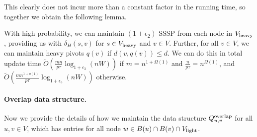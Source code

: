 This clearly does not incur more than a constant factor in the running time, so together we obtain the following lemma. 

\begin{lemma} \label{lm:heavy_MSSP}
    With high probability, we can maintain $(1+\epsilon_2)$-SSSP from each node in $ V_{\rm{heavy}} $, providing us with $\delta_H(s,v)$ for $s\in V_{\rm{heavy}}$ and $v\in V$. Further, for all $v\in V$, we can maintain heavy pivots $q(v)$ if $d(v,q(v))\leq d$. We can do this in total update time $ \tilde O (\tfrac{m n }{p\tau}\log_{1+\epsilon_3}(nW)) $ if $m=n^{1+\Omega(1)}$ and $\tfrac{n}{p\tau}=n^{\Omega(1)}$, and $ \tilde O (\tfrac{m n^{1+o(1)} }{p\tau}\log_{1+\epsilon_3}(nW)) $ otherwise. 
\end{lemma}


\paragraph{Overlap data structure.}
Now we provide the details of how we maintain the data structure $Q^{\rm{overlap}}_{u,v}$ for all $u,v\in V$, which has entries for all node $w\in B(u)\cap B(v)\cap V_{\rm{light}}$.




